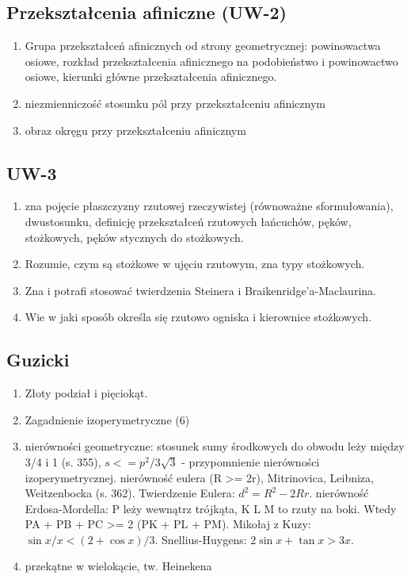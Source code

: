 \subsection{Przekształcenia afiniczne (UW-2)}
\begin{enumerate}
	\item Grupa przekształceń afinicznych od strony geometrycznej: powinowactwa osiowe, rozkład przekształcenia afinicznego na podobieństwo i powinowactwo osiowe, kierunki główne przekształcenia afinicznego.
	\item niezmienniczość stosunku pól przy przekształceniu afinicznym
	\item obraz okręgu przy przekształceniu afinicznym
\end{enumerate}

\subsection{UW-3}
\begin{enumerate}
	\item zna pojęcie płaszczyzny rzutowej rzeczywistej (równoważne sformułowania), dwustosunku, definicję przekształceń rzutowych łańcuchów, pęków, stożkowych, pęków stycznych do stożkowych. 
	\item Rozumie, czym są stożkowe w ujęciu rzutowym, zna typy stożkowych.
	\item Zna i potrafi stosować twierdzenia Steinera i Braikenridge'a-Maclaurina.
	\item Wie w jaki sposób określa się rzutowo ogniska i kierownice stożkowych.
\end{enumerate}

\subsection{Guzicki}
\begin{enumerate}
	\item Złoty podział i pięciokąt.
	\item Zagadnienie izoperymetryczne (6)
	\item nierówności geometryczne: stosunek sumy środkowych do obwodu leży między 3/4 i 1 (s. 355), $s <= p^2 / 3 \sqrt 3$ - przypomnienie nierówności izoperymetrycznej. nierówność eulera (R >= 2r), Mitrinovica, Leibniza, Weitzenbocka (s. 362). Twierdzenie Eulera: $d^2 = R^2 - 2Rr$. nierówność Erdosa-Mordella: P leży wewnątrz trójkąta, K L M to rzuty na boki. Wtedy PA + PB + PC >= 2 (PK + PL + PM). Mikołaj z Kuzy: $\sin x / x < (2 + \cos x) / 3$. Snellius-Huygens: $2 \sin x + \tan x > 3x$.
	\item przekątne w wielokącie, tw. Heinekena %
\end{enumerate}

